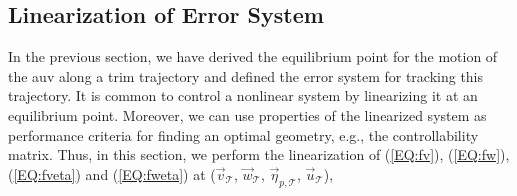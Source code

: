 \subsection{Linearization of Error System}
In the previous section, we have derived the equilibrium point for the motion of the \ac{auv} along a trim trajectory and defined the error system for tracking this trajectory. It is common to control a nonlinear system by linearizing it at an equilibrium point. Moreover, we can use properties of the linearized system as performance criteria for finding an optimal geometry, e.g., the controllability matrix. Thus, in this section, we perform the linearization of (\ref{EQ:fv}), (\ref{EQ:fw}), (\ref{EQ:fveta}) and (\ref{EQ:fweta}) at ($\vec{v}_{\mathcal{T}}$, $\vec{w}_{\mathcal{T}}$, $\vec{\eta}_{p,\mathcal{T}}$, $\vec{u}_{\mathcal{T}}$),

